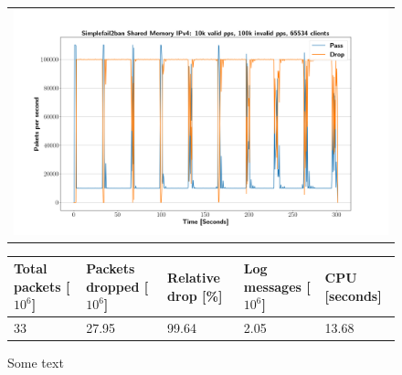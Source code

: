 \begin{figure}[p]
	\label{fig:simplefail2ban:shm:ip4:100k}
	\centering
	\scriptsize
	\begin{tabular}{c}
    	\centerline{\includegraphics[width=1.2\textwidth]{images/simplefail2ban_shm_ipv4_v10k_iv100k_c65534.png}}
	\end{tabular}
	\begin{tabular}{lllll}
		\toprule
		\textbf{Total packets [$10^6$]} & \textbf{Packets dropped [$10^6$]} & \textbf{Relative drop [\%]} & \textbf{Log messages [$10^6$]} & \textbf{CPU [seconds]} \\ \midrule 
		33 & 27.95 & 99.64 & 2.05 & 13.68 \\
		\bottomrule
	\end{tabular}
	\caption[Simplefail2ban Shared Memory IPv4 1m PPS]{Some text}
\end{figure}

